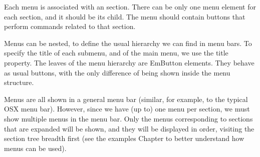 Each menu is associated with an section. There can be only one menu element for each section, and it
should be its child. The menu should contain buttons that perform commands related to that section.

Menus can be nested, to define the usual hierarchy we can find in menu bars. To specify the title of
each submenu, and of the main menu, we use the title property. The leaves of the menu hierarchy are EmButton
elements. They behave as usual buttons, with the only difference of being shown inside the menu structure.

Menus are all shown in a general menu bar (similar, for example, to the typical OSX menu bar).
However, since we have (up to) one menu per section, we must show multiple menus in the menu bar. Only the
menus corresponding to sections that are expanded will be shown, and they will be displayed in order,
visiting the section tree breadth first (see the examples Chapter to better understand how menus can be used).

